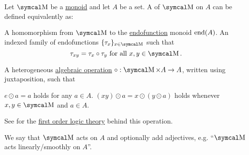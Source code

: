 \begin{definition}\label{def:left_monoid_action}
  Let \( \CM \) be a \hyperref[def:unital_magma/associative]{monoid} and let \( A \) be a set. A  of \( \CM \) on \( A \) can be defined equivalently as:
  \begin{DefEnum}
     A homomorphism from \( \CM \) to the \hyperref[def:endofunction]{endofunction} monoid \( \operatorname{end}(A) \).
     An indexed family of endofunctions \( \{ \tau_x \}_{x \in \CM} \) such that
    \begin{equation}\label{eq:def:left_monoid_action/indirect_homomorphism}
      \tau_{xy} = \tau_x \circ \tau_y \T{for all} x, y \in \CM.
    \end{equation}

     A heterogeneous \hyperref[def:magma]{algebraic operation} \( \circ: \CM \times A \to A \), written using juxtaposition, such that
    \begin{DefEnum}
       \( e \odot a = a \) holds for any \( a \in A \).
       \( (xy) \odot a = x \odot (y \odot a) \) holds whenever \( x, y \in \CM \) and \( a \in A \).
    \end{DefEnum}

    See  for the \hyperref[def:first_order_theory]{first order logic theory} behind this operation.
  \end{DefEnum}

  We say that \( \CM \) acts on \( A \) and optionally add adjectives, e.g. \enquote{\( \CM \) acts linearly/smoothly on \( A \)}.
\end{definition}
